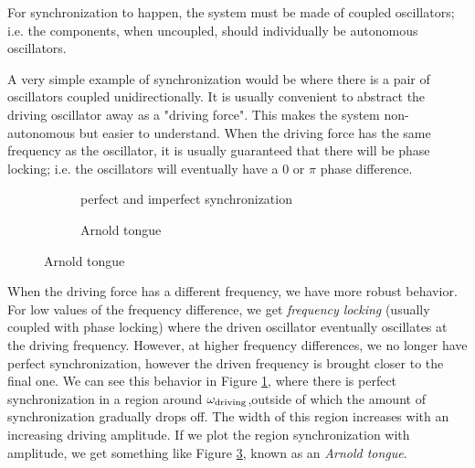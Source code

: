 \documentclass[12pt]{article}
\begin{document}
For synchronization to happen, the system must be made of coupled oscillators; i.e. the components, when uncoupled, should individually be autonomous oscillators.

A very simple example of synchronization would be where there is a pair of oscillators coupled unidirectionally. It is usually convenient to abstract the driving oscillator away as a "driving force". This makes the system non-autonomous but easier to understand. When the driving force has the same frequency as the oscillator, it is usually guaranteed that there will be phase locking; i.e. the oscillators will eventually have a $0$ or $\pi$ phase difference.

\begin{figure}
\centering
\begin{subfigure}[b]{0.4\textwidth}

\caption{perfect and imperfect synchronization}\label{fig:detuning}
\end{subfigure}
\begin{subfigure}[b]{0.4\textwidth}

\caption{Arnold tongue}\label{fig:arnold}
\end{subfigure}
\end{figure}

When the driving force has a different frequency, we have more robust behavior. For low values of the frequency difference, we get \emph{frequency locking} (usually coupled with phase locking) where the driven oscillator eventually oscillates at the driving frequency. However, at higher frequency differences, we no longer have perfect synchronization, however the driven frequency is brought closer to the final one. We can see this behavior in Figure \ref{fig:detuning}, where there is perfect synchronization in a region around $\omega_{\rm driving}$,outside of which the amount of synchronization gradually drops off. The width of this region increases with an increasing driving amplitude. If we plot the region synchronization with amplitude, we get something like Figure \ref{fig:arnold}, known as an \emph{Arnold tongue}\cite{pikovsky2001synchronization}.
\end{document}
